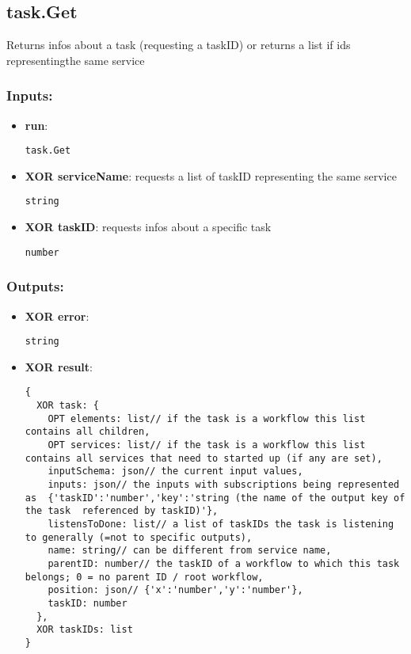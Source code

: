 \subsection{task.Get}
\label{ch:builtinservices:task.Get}
Returns infos about a task (requesting a taskID) or returns a list if ids representingthe same service
\subsubsection*{Inputs:}
\begin{itemize}
    \item \textbf{run}: 
\begin{lstlisting}
task.Get
\end{lstlisting}
    \item \textbf{XOR serviceName}: requests a list of taskID representing the same service
\begin{lstlisting}
string
\end{lstlisting}
    \item \textbf{XOR taskID}: requests infos about a specific task
\begin{lstlisting}
number
\end{lstlisting}
  \end{itemize}

\subsubsection*{Outputs:}
\begin{itemize}
    \item \textbf{XOR error}: 
\begin{lstlisting}
string
\end{lstlisting}
    \item \textbf{XOR result}: 
\begin{lstlisting}
{
  XOR task: {
    OPT elements: list// if the task is a workflow this list contains all children, 
    OPT services: list// if the task is a workflow this list contains all services that need to started up (if any are set), 
    inputSchema: json// the current input values, 
    inputs: json// the inputs with subscriptions being represented as  {'taskID':'number','key':'string (the name of the output key of the task  referenced by taskID)'}, 
    listensToDone: list// a list of taskIDs the task is listening to generally (=not to specific outputs), 
    name: string// can be different from service name, 
    parentID: number// the taskID of a workflow to which this task belongs; 0 = no parent ID / root workflow, 
    position: json// {'x':'number','y':'number'}, 
    taskID: number
  }, 
  XOR taskIDs: list
}
\end{lstlisting}
  \end{itemize}

